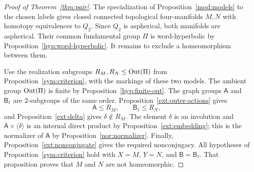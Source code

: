 \begin{proof}[Proof of Theorem~\ref{thm:pair}]
The specialization of Proposition~\ref{mod:models} to the
chosen labels gives closed connected topological
four-manifolds $M,N$ with homotopy equivalences to $Q_2$.
Since $Q_2$ is aspherical, both manifolds are aspherical.
Their common fundamental group $\Pi$ is word-hyperbolic by
Proposition~\ref{hyp:word-hyperbolic}.
It remains to exclude a homeomorphism between them.

Use the realization subgroups $R_M,R_N\leq\operatorname{Out}(\Pi)$
from Proposition~\ref{sym:criterion}, with the markings
of these two models.  The ambient group $\operatorname{Out}(\Pi)$ is
finite by Proposition~\ref{hyp:finite-out}.  The graph
groups $\mathsf A$ and $\mathsf B_\ell$ are $2$-subgroups
of the same order.  Proposition~\ref{ext:outer-actions}
gives
\[
 \mathsf A\leq R_M,\qquad \mathsf B_\ell\leq R_N,
\]
and Proposition~\ref{ext:delta} gives $\delta\notin R_M$.
The element $\delta$ is an involution and
$\mathsf A\times\langle\delta\rangle$ is an internal direct
product by Proposition~\ref{ext:embedding}; this is the
normalizer of $\mathsf A$ by
Proposition~\ref{nor:normalizer}.  Finally,
Proposition~\ref{ext:nonconjugate} gives the required
nonconjugacy.  All hypotheses of Proposition~\ref{sym:criterion}
hold with $X=M$, $Y=N$, and $\mathsf B=\mathsf B_\ell$.
That proposition proves that $M$ and $N$ are not homeomorphic.
\end{proof}
